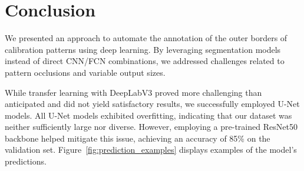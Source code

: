 \section{Conclusion}

We presented an approach to automate the annotation of the outer borders of calibration patterns using deep learning. By leveraging segmentation models instead of direct CNN/FCN combinations, we addressed challenges related to pattern occlusions and variable output sizes. 

While transfer learning with DeepLabV3 proved more challenging than anticipated and did not yield satisfactory results, we successfully employed U-Net models. All U-Net models exhibited overfitting, indicating that our dataset was neither sufficiently large nor diverse. However, employing a pre-trained ResNet50 backbone helped mitigate this issue, achieving an accuracy of 85\% on the validation set. Figure~\ref{fig:prediction_examples} displays examples of the model's predictions. 
